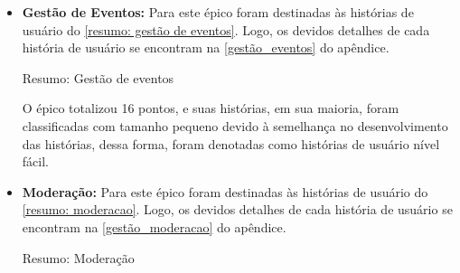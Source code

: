 \begin{itemize}
\item {\textbf{Gestão de Eventos:}} Para este épico foram destinadas às histórias de usuário do \autoref{resumo: gestão de eventos}. Logo, os devidos detalhes de cada história de usuário se encontram na \autoref{gestão_eventos} do apêndice.

\def\arraystretch{2}
\begin{quadro}[htb]
\centering
\ABNTEXfontereduzida
\caption{Resumo: Gestão de eventos}
\label{resumo: gestão de eventos}
\end{quadro}
\FloatBarrier 

O épico totalizou 16 pontos, e suas histórias, em sua maioria, foram classificadas com tamanho pequeno devido à semelhança no desenvolvimento das histórias, dessa forma, foram denotadas como histórias de usuário nível fácil.

\item {\textbf{Moderação:}} Para este épico foram destinadas às histórias de usuário do \autoref{resumo: moderacao}. Logo, os devidos detalhes de cada história de usuário se encontram na \autoref{gestão_moderacao} do apêndice.

\def\arraystretch{2}
\begin{quadro}[htb]
\centering
\ABNTEXfontereduzida
\caption{Resumo: Moderação}
\label{resumo: moderacao}
\end{quadro}
\FloatBarrier 


\end{itemize}
